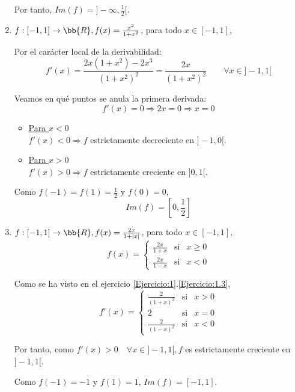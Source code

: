 \begin{ejercicio}
\begin{enumerate}
        Por tanto, $Im(f)=]-\infty, \frac{1}{2}[$.

        \item $f:[-1,1]\to \bb{R}, f(x)=\frac{x^2}{1+x^2}$, para todo $x\in[-1,1]$,

        Por el carácter local de la derivabilidad:
        $$f'(x)=\frac{2x(1+x^2)-2x^3}{(1+x^2)^2} = \frac{2x}{(1+x^2)^2}\qquad \forall x \in ]-1,1[$$

        Veamos en qué puntos se anula la primera derivada:
        \begin{equation*}
            f'(x)=0 \Longrightarrow 2x=0 \Longrightarrow x=0
        \end{equation*}

        \begin{itemize}
            \item \underline{Para $x<0$}\\$f'(x)<0 \Longrightarrow f$ estrictamente decreciente en $]-1,0[$.
            \item \underline{Para $x>0$}\\$f'(x)>0 \Longrightarrow f$ estrictamente creciente en $]0,1[$.
        \end{itemize}

        Como $f(-1)=f(1)=\frac{1}{2}$ y $f(0)=0$,
        $$Im(f)=\left[0,\frac{1}{2}\right]$$

        \item $f:[-1,1]\to \bb{R}, f(x)=\frac{2x}{1+|x|}$, para todo $x\in[-1,1]$,
        $$f(x)=\left\{
        \begin{array}{ccc}
        \frac{2x}{1+x} & \text{si} & x\geq 0 \\
        \frac{2x}{1-x} & \text{si} & x<0
        \end{array}\right.$$

        Como se ha visto en el ejercicio \ref{Ejercicio:1}.\ref{Ejercicio:1.3},        
        $$f'(x)=\left\{
        \begin{array}{ccc}
        \displaystyle \frac{2}{(1+x)^2} & \text{si} & x> 0 \\
        2 & \text{si} & x= 0 \\
        \displaystyle \frac{2}{(1-x)^2} & \text{si} & x<0
        \end{array}\right.$$

        Por tanto, como $f'(x)>0 \quad \forall x\in ]-1,1[, f$ es estrictamente creciente en $]-1,1[$.

        Como $f(-1)=-1$ y $f(1)=1$, $Im(f)=[-1,1]$.


\end{enumerate}
\end{ejercicio}
